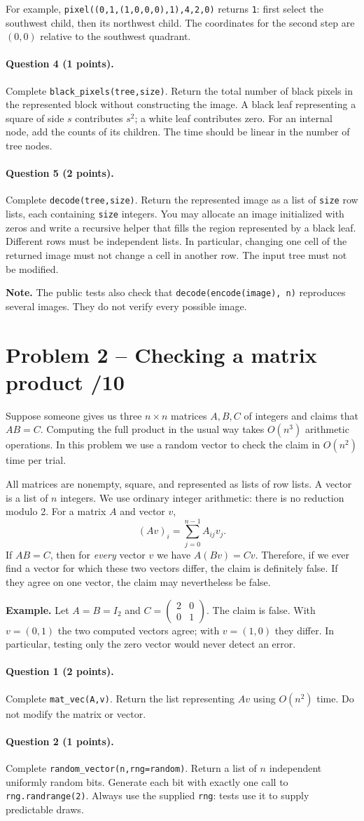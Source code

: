 \documentclass[11pt,a4paper]{article}
\newcommand{\q}[2]{\paragraph{Question #1 (#2 points).}}
\begin{document}
For example, \texttt{pixel((0,1,(1,0,0,0),1),4,2,0)} returns \texttt{1}: first select the southwest child, then its northwest child. The coordinates for the second step are $(0,0)$ relative to the southwest quadrant.
\q{4}{1} Complete \texttt{black\_pixels(tree,size)}. Return the total number of black pixels in the represented block without constructing the image. A black leaf representing a square of side $s$ contributes $s^2$; a white leaf contributes zero. For an internal node, add the counts of its children. The time should be linear in the number of tree nodes.
\q{5}{2} Complete \texttt{decode(tree,size)}. Return the represented image as a list of \texttt{size} row lists, each containing \texttt{size} integers. You may allocate an image initialized with zeros and write a recursive helper that fills the region represented by a black leaf. Different rows must be independent lists. In particular, changing one cell of the returned image must not change a cell in another row. The input tree must not be modified.

\textbf{Note.} The public tests also check that \texttt{decode(encode(image), n)} reproduces several images. They do not verify every possible image.
\newpage
\section*{Problem 2 -- Checking a matrix product \hfill /10}
Suppose someone gives us three $n\times n$ matrices $A,B,C$ of integers and claims that $AB=C$. Computing the full product in the usual way takes $O(n^3)$ arithmetic operations. In this problem we use a random vector to check the claim in $O(n^2)$ time per trial.

All matrices are nonempty, square, and represented as lists of row lists. A vector is a list of $n$ integers. We use ordinary integer arithmetic: there is no reduction modulo 2. For a matrix $A$ and vector $v$,
\[
(Av)_i=\sum_{j=0}^{n-1} A_{ij}v_j.
\]
If $AB=C$, then for \emph{every} vector $v$ we have $A(Bv)=Cv$. Therefore, if we ever find a vector for which these two vectors differ, the claim is definitely false. If they agree on one vector, the claim may nevertheless be false.

\textbf{Example.} Let $A=B=I_2$ and $C=\begin{pmatrix}2&0\\0&1\end{pmatrix}$. The claim is false. With $v=(0,1)$ the two computed vectors agree; with $v=(1,0)$ they differ. In particular, testing only the zero vector would never detect an error.
\q{1}{2} Complete \texttt{mat\_vec(A,v)}. Return the list representing $Av$ using $O(n^2)$ time. Do not modify the matrix or vector.
\q{2}{1} Complete \texttt{random\_vector(n,rng=random)}. Return a list of $n$ independent uniformly random bits. Generate each bit with exactly one call to \texttt{rng.randrange(2)}. Always use the supplied \texttt{rng}: tests use it to supply predictable draws.
\newpage
\end{document}
